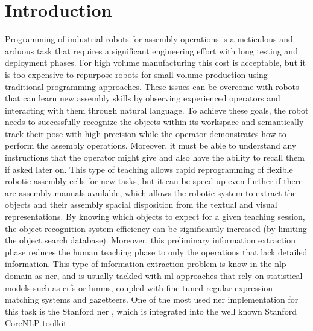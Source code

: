 \section{Introduction}\label{sec:introduction}

Programming of industrial robots for assembly operations is a meticulous and arduous task that requires a significant engineering effort with long testing and deployment phases. For high volume manufacturing this cost is acceptable, but it is too expensive to repurpose robots for small volume production using traditional programming approaches. These issues can be overcome with robots that can learn new assembly skills by observing experienced operators and interacting with them through natural language. To achieve these goals, the robot needs to successfully recognize the objects within its workspace and semantically track their pose with high precision while the operator demonstrates how to perform the assembly operations. Moreover, it must be able to understand any instructions that the operator might give and also have the ability to recall them if asked later on. This type of teaching allows rapid reprogramming of flexible robotic assembly cells for new tasks, but it can be speed up even further if there are assembly manuals available, which allows the robotic system to extract the objects and their assembly spacial disposition from the textual and visual representations. By knowing which objects to expect for a given teaching session, the object recognition system efficiency can be significantly increased (by limiting the object search database). Moreover, this preliminary information extraction phase reduces the human teaching phase to only the operations that lack detailed information. This type of information extraction problem is know in the \gls{nlp} domain as \gls{ner}, and is usually tackled with \gls{ml} approaches that rely on statistical models such as \glspl{crf} or \glspl{hmm}, coupled with fine tuned regular expression matching systems and gazetteers. One of the most used \gls{ner} implementation for this task is the Stanford \gls{ner} \cite{Finkel2005}, which is integrated into the well known Stanford CoreNLP toolkit \cite{manning2014}.

